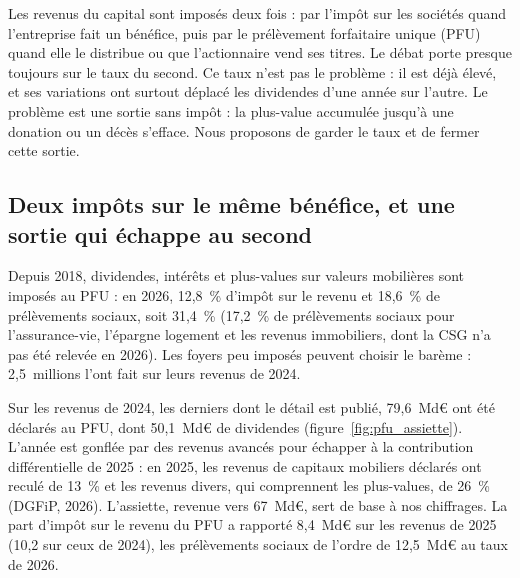 
Les revenus du capital sont imposés deux fois : par l'impôt sur les sociétés quand l'entreprise fait un bénéfice,
puis par le prélèvement forfaitaire unique (PFU) quand elle le distribue ou que l'actionnaire vend ses titres. Le
débat porte presque toujours sur le taux du second. Ce taux n'est pas le problème : il est déjà élevé, et ses
variations ont surtout déplacé les dividendes d'une année sur l'autre. Le problème est une sortie sans impôt : la
plus-value accumulée jusqu'à une donation ou un décès s'efface. Nous proposons de garder le taux et de fermer cette
sortie.

\subsection{Deux impôts sur le même bénéfice, et une sortie qui échappe au second}\label{sec:pfu_situation}

Depuis 2018, dividendes, intérêts et plus-values sur valeurs mobilières sont imposés au PFU : en 2026, 12,8~\%
d'impôt sur le revenu et 18,6~\% de prélèvements sociaux, soit 31,4~\% (17,2~\% de prélèvements sociaux pour
l'assurance-vie, l'épargne logement et les revenus immobiliers, dont la CSG n'a pas été relevée en 2026). Les foyers
peu imposés peuvent choisir le barème : 2,5~millions l'ont fait sur leurs revenus de 2024.

Sur les revenus de 2024, les derniers dont le détail est publié, 79,6~Md€ ont été déclarés au PFU, dont 50,1~Md€ de
dividendes (figure~\ref{fig:pfu_assiette}). L'année est gonflée par des revenus avancés pour échapper à la contribution
différentielle de 2025 : en 2025, les revenus de capitaux mobiliers déclarés ont reculé de 13~\% et les revenus
divers, qui comprennent les plus-values, de 26~\% (DGFiP, 2026). L'assiette, revenue vers 67~Md€, sert de base à nos
chiffrages. La part d'impôt sur le revenu du PFU a rapporté 8,4~Md€ sur les revenus de 2025 (10,2 sur ceux de
2024), les prélèvements sociaux de l'ordre de 12,5~Md€ au taux de 2026.

